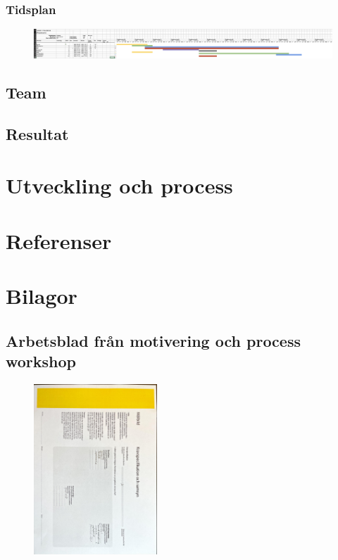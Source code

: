 \documentclass{article}
\begin{document}
\subsubsection{Tidsplan}

\begin{figure}[htp]
    \centering
    \includegraphics[width = 450px]{Gant.png}
    \label{fig:24}
\end{figure}

\subsection{Team}
\subsection{Resultat}

\section{Utveckling och process}


\section{Referenser}

\section{Bilagor}
\subsection{Arbetsblad från motivering och process workshop}


\begin{figure}[htp]
    \centering
    \includegraphics[width = 175px,angle=90]{KS.jpg}
    \label{fig:24}
\end{figure}
\end{document}

